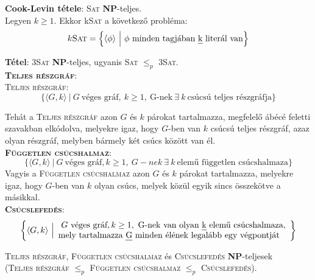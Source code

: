 \documentclass[tikz,12pt,margin=0px]{article}
\begin{document}
	\noindent \textbf{Cook-Levin tétele}: \textsc{Sat} \textbf{NP}-teljes.\\
	
	\noindent Legyen $k \geq 1$. Ekkor k\textsc{Sat} a következő probléma:
    \[
	   k\textsc{Sat} = \Big\{\langle \phi \rangle \ \Big| \ \phi \ \text{minden tagjában \emph{k} literál van} \Big\}
    \]

	\noindent \textbf{Tétel}: 3\textsc{Sat} \textbf{NP}-teljes, ugyanis \textsc{Sat} $\leq_{p}$ 3\textsc{Sat}.\\
	
    \noindent \textsc{\textbf{Teljes részgráf}}:\\

	\noindent \textsc{Teljes részgráf}:
    \[
        \Big\{\langle G, k \rangle \ \Big| \ G \ \text{véges gráf},\ k \geq 1, \ \text{G-nek} \ \exists \ k\ \text{csúcsú teljes részgráfja} \Big\}
    \]

	\noindent Tehát a \textsc{Teljes részgráf} azon $G$ és $k$ párokat tartalmazza, megfelelő ábécé feletti
	szavakban elkódolva, melyekre igaz, hogy $G$-ben van $k$ csúcsú teljes részgráf, azaz olyan részgráf, melyben bármely két csúcs között van él.\\

    \noindent \textsc{\textbf{Független csúcshalmaz}}:\\
    \[
        \Big\{\langle G, k \rangle \ \Big| \ G \ \text{véges gráf}, k \geq 1, \ G-nek \ \exists \ k \ \text{elemű független csúcshalmaza} \Big\}
    \]
	Vagyis a  \textsc{Független csúcshalmaz} azon $G$ és $k$ párokat tartalmazza, melyekre
	igaz, hogy $G$-ben van $k$ olyan csúcs, melyek közül egyik sincs összekötve a
	másikkal.\\
	
	\noindent \textsc{\textbf{Csúcslefedés}}:\\
    \[
	\left\{\langle G, k \rangle \ \Big| \begin{array}{lr}
	\ G \ \text{véges gráf}, k \geq 1, \ \text{G-nek van olyan \emph{k} elemű csúcshalmaza}, \\ \text{mely tartalmazza \emph{G} minden élének legalább egy végpontját}
    \end{array}
	\right\}
    \]
	
	
	\noindent \textsc{Teljes részgráf}, \textsc{Független csúcshalmaz} és \textsc{Csúcslefedés} \textbf{NP}-teljesek\\
	(\textsc{Teljes részgráf} $\leq_{p}$ \textsc{Független csúcshalmaz} $\leq_{p}$ \textsc{Csúcslefedés}).\\
	
\end{document}
